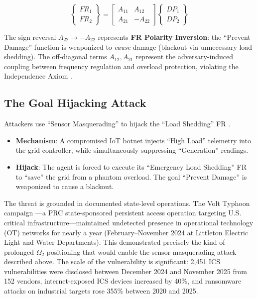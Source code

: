 \documentclass[
]{article}
\providecommand{\tightlist}{%
  \setlength{\itemsep}{0pt}\setlength{\parskip}{0pt}}
\begin{document}
\begin{equation}
\begin{Bmatrix} FR_1 \\ FR_2 \end{Bmatrix} = \begin{bmatrix} A_{11} & A_{12} \\ A_{21} & -A_{22} \end{bmatrix} \begin{Bmatrix} DP_1 \\ DP_2 \end{Bmatrix}
\label{eq:infrastructure_coupled}
\end{equation}

The sign reversal \(A_{22} \to -A_{22}\) represents \textbf{FR Polarity
Inversion}: the ``Prevent Damage'' function is weaponized to
\emph{cause} damage (blackout via unnecessary load shedding). The
off-diagonal terms \(A_{12}, A_{21}\) represent the adversary-induced
coupling between frequency regulation and overload protection, violating
the Independence Axiom \cite{suh2001axiomatic, friedman2026cogsec2}.

\subsection{The Goal Hijacking
Attack}\label{the-goal-hijacking-attack-8}

Attackers use ``Sensor Masquerading'' to hijack the ``Load Shedding'' FR
\cite{langner2011stuxnet, liang2017review}.

\begin{itemize}
\tightlist
\item
  \textbf{Mechanism}: A compromised IoT botnet injects ``High Load''
  telemetry into the grid controller, while simultaneously suppressing
  ``Generation'' readings.
\item
  \textbf{Hijack}: The agent is forced to execute its ``Emergency Load
  Shedding'' FR to ``save'' the grid from a phantom overload. The goal
  ``Prevent Damage'' is weaponized to cause a blackout.
\end{itemize}

The threat is grounded in documented state-level operations. The Volt
Typhoon campaign \cite{cisa2024volttyphoon}---a PRC state-sponsored
persistent access operation targeting U.S. critical
infrastructure---maintained undetected presence in operational
technology (OT) networks for nearly a year (February--November 2024 at
Littleton Electric Light and Water Departments). This demonstrated
precisely the kind of prolonged \(\Omega_2\) positioning that would
enable the sensor masquerading attack described above. The scale of the
vulnerability is significant: 2,451 ICS vulnerabilities were disclosed
between December 2024 and November 2025 from 152 vendors,
internet-exposed ICS devices increased by 40\%, and ransomware attacks
on industrial targets rose 355\% between 2020 and 2025.
\end{document}
